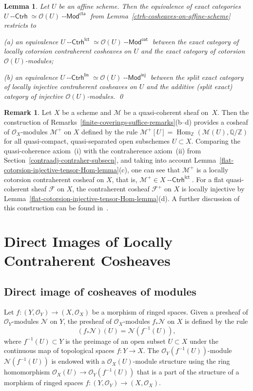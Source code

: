 \documentclass[12pt,a4paper]{amsart}
\newcommand{\+}{\nobreakdash-}
\renewcommand{\:}{\colon}
\newcommand{\rarrow}{\longrightarrow}
\DeclareMathOperator{\Hom}{Hom}
\newcommand{\Modl}{{\operatorname{\mathsf{--Mod}}}}
\newcommand{\Ctrh}{{\operatorname{\mathsf{--Ctrh}}}}
\newcommand{\inj}{\mathsf{inj}}
\renewcommand{\cot}{\mathsf{cot}}
\newcommand{\cta}{\mathsf{cta}}
\newcommand{\lct}{\mathsf{lct}}
\newcommand{\lin}{\mathsf{lin}}
\newcommand{\cO}{\mathcal O}
\newcommand{\cF}{\mathcal F}
\newcommand{\cM}{\mathcal M}
\newcommand{\cN}{\mathcal N}
\newcommand{\boQ}{\mathbb Q}
\newcommand{\boZ}{\mathbb Z}
\newcommand{\Section}[1]{\bigskip\section{#1}\medskip}
\theoremstyle{plain}
\newtheorem{lem}[thm]{Lemma}
\theoremstyle{definition}
\newtheorem{rem}[thm]{Remark}
\begin{document}
\begin{lem} \label{ctrh-lct-lin-cosheaves-on-affine-scheme}
 Let $U$ be an affine scheme.
 Then the equivalence of exact categories $U\Ctrh\simeq\cO(U)\Modl^\cta$
from Lemma~\ref{ctrh-cosheaves-on-affine-scheme} restricts to \par
\textup{(a)} an equivalence $U\Ctrh^\lct\simeq\cO(U)\Modl^\cot$ between 
the exact category of locally cotorsion contraherent cosheaves on $U$
and the exact category of cotorsion\/ $\cO(U)$\+modules; \par
\textup{(b)} an equivalence $U\Ctrh^\lin\simeq\cO(U)\Modl^\inj$ between
the split exact category of locally injective contraherent cosheaves
on $U$ and the additive (split exact) category of injective\/
$\cO(U)$\+modules. \qed
\end{lem}

\begin{rem} \label{character-cosheaf-ctrh-lct-remark}
 Let $X$ be a scheme and $\cM$ be a quasi-coherent sheaf on~$X$.
 Then the construction of
Remarks~\ref{finite-coverings-suffice-remarks}(b\+-d) provides
a cosheaf of $\cO_X$\+modules $\cM^+$ on $X$ defined by the rule
$\cM^+[U]=\Hom_\boZ(\cM(U),\boQ/\boZ)$ for all quasi-compact,
quasi-separated open subschemes $U\subset X$.
 Comparing the quasi-coherence axiom~(i) with the contraherence
axiom~(ii) from Section~\ref{contraadj-contraher-subsecn}, and taking
into account Lemma~\ref{flat-cotorsion-injective-tensor-Hom-lemma}(c),
one can see that $\cM^+$ is a locally cotorsion contraherent cosheaf
on $X$, that is, $\cM^+\in X\Ctrh^\lct$.
 For a flat quasi-coherent sheaf $\cF$ on $X$, the contraherent cosheaf
$\cF^+$ on $X$ is locally injective by
Lemma~\ref{flat-cotorsion-injective-tensor-Hom-lemma}(d).
 A further discussion of this construction can be found 
in~\cite[beginning of Section~2.4]{Pcosh}.
\end{rem}


\Section{Direct Images of Locally Contraherent Cosheaves}

\subsection{Direct image of cosheaves of modules}
 Let $f\:(Y,\cO_Y)\rarrow(X,\cO_X)$ be a morphism of ringed spaces.
 Given a presheaf of $\cO_Y$\+modules $\cN$ on $Y$, the presheaf
of $\cO_X$\+modules $f_*\cN$ on $X$ is defined by the rule
$$
 (f_*\cN)(U)=\cN(f^{-1}(U)),
$$
where $f^{-1}(U)\subset Y$ is the preimage of an open subset
$U\subset X$ under the continuous map of topological spaces
$f\:Y\rarrow X$.
 The $\cO_Y(f^{-1}(U))$\+module $\cN(f^{-1}(U))$ is endowed with
a $\cO_X(U)$\+module structure using the ring homomorphism
$\cO_X(U)\rarrow\cO_Y(f^{-1}(U))$ that is a part of the structure of
a morphism of ringed spaces $f\:(Y,\cO_Y)\rarrow(X,\cO_X)$.
{\par}
\end{document}
